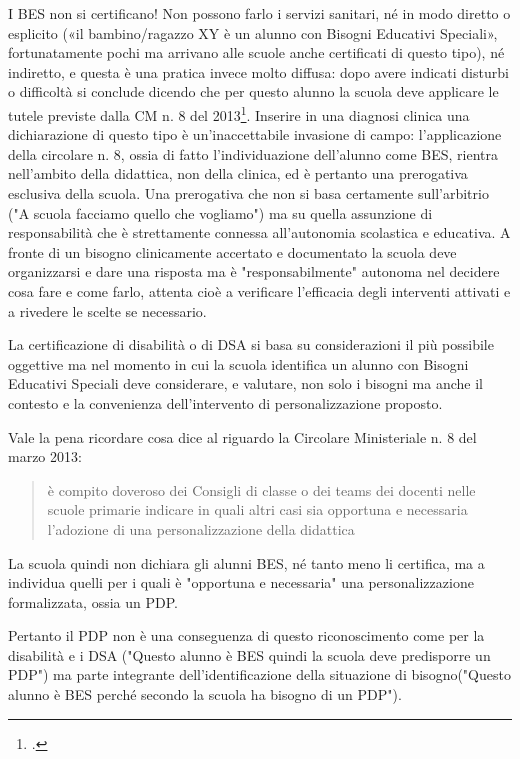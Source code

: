 I BES non si certificano! Non possono farlo i servizi sanitari, né in modo diretto o esplicito («il bambino/ragazzo XY è un alunno con Bisogni Educativi Speciali», fortunatamente pochi ma arrivano alle scuole anche certificati di questo tipo), né indiretto, e questa è una pratica invece molto diffusa: dopo avere indicati disturbi o difficoltà si conclude dicendo che per questo alunno la scuola deve applicare le tutele previste dalla CM n. 8 del 2013\footcite{cm8_2013}. Inserire in una diagnosi clinica una dichiarazione di questo tipo è un'inaccettabile invasione di campo: l'applicazione della circolare n. 8, ossia di fatto l'individuazione dell'alunno come BES, rientra nell'ambito della didattica, non della clinica, ed è pertanto una prerogativa esclusiva della scuola. Una prerogativa che non si basa certamente sull'arbitrio ("A scuola facciamo quello che vogliamo") ma su quella assunzione di responsabilità che è strettamente connessa all'autonomia scolastica e educativa. A fronte di un bisogno clinicamente accertato e documentato la scuola deve organizzarsi e dare una risposta ma è "responsabilmente" autonoma nel decidere cosa fare e come farlo, attenta cioè a verificare l'efficacia degli interventi attivati e a rivedere le scelte se necessario.

La certificazione di disabilità o di DSA si basa su considerazioni il più possibile oggettive ma nel momento in cui la scuola identifica un alunno con Bisogni Educativi Speciali deve considerare, e valutare, non solo i bisogni ma anche il contesto e la convenienza dell'intervento di personalizzazione proposto.

Vale la pena ricordare cosa dice al riguardo la Circolare Ministeriale n. 8 del marzo 2013: 
\begin{quote}
	\mancatesto è compito doveroso dei Consigli di classe o dei teams dei docenti nelle scuole primarie indicare in quali altri casi sia opportuna e necessaria l'adozione di una personalizzazione della didattica\mancatesto
\end{quote}

La scuola quindi non dichiara gli alunni BES, né tanto meno li certifica, ma a individua quelli per i quali è "opportuna e necessaria" una personalizzazione formalizzata, ossia un PDP.

Pertanto il PDP non è una conseguenza di questo riconoscimento come per la disabilità e i DSA ("Questo alunno è BES quindi la scuola deve predisporre un PDP") ma parte integrante dell'identificazione della situazione di bisogno("Questo alunno è BES perché secondo la scuola ha bisogno di un PDP").


